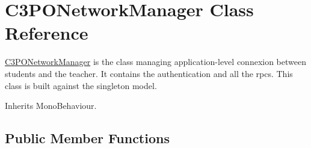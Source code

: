 \hypertarget{class_c3_p_o_network_manager}{\section{C3\-P\-O\-Network\-Manager Class Reference}
\label{class_c3_p_o_network_manager}
}


\hyperlink{class_c3_p_o_network_manager}{C3\-P\-O\-Network\-Manager} is the class managing application-\/level connexion between students and the teacher. It contains the authentication and all the rpcs. This class is built against the singleton model. 




Inherits Mono\-Behaviour.

\subsection*{Public Member Functions}
